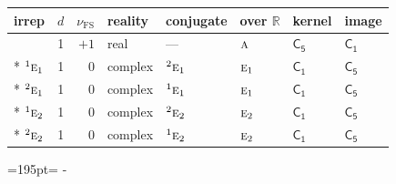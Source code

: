 \documentclass[10pt,a4paper]{article}
\newcommand{\needspace}[1]{\par\penalty-100\begingroup\dimen0=#1\relax\dimen2=\pagegoal
  \advance\dimen2-\pagetotal\ifdim\dimen0>\dimen2\relax\ifdim\dimen2>0pt\vfil\break\fi\fi
  \endgroup}
\numberwithin{equation}{section}
\newcommand{\grp}[1]{\mathsf{#1}}
\newcommand{\irr}[1]{\text{\normalfont\scshape #1}}
\newcommand{\conjpair}[1]{{}^{#1}}
\newcommand{\detbox}[1]{{\setlength{\fboxsep}{1pt}\fbox{#1}}}
\newcommand{\fsind}{\nu_{\mathrm{FS}}}
\begin{document}
{\small\renewcommand{\arraystretch}{1.25}\setlength{\tabcolsep}{4pt}\begin{longtable}{@{}lrrlllll@{}}\toprule
irrep & $d$ & $\fsind$ & reality & conjugate & over $\mathbb{R}$ & kernel & image\\\midrule\endhead
\bottomrule\endfoot\endlastfoot
\detbox{$\irr{a}$} & 1 & $+1$ & real & --- & $\irr{a}$ & \href{C5.pdf}{$\grp{C_{5}}$} & \href{../../../rotation/data/pdf/C1.pdf}{$\grp{C_{1}}$}\\*
$\conjpair{1}\irr{e}_{1}$ & 1 & $0$ & complex & $\conjpair{2}\irr{e}_{1}$ & $\irr{e}_{1}$ & \href{C1.pdf}{$\grp{C_{1}}$} & \href{../../../rotation/data/pdf/C5.pdf}{$\grp{C_{5}}$}\\*
$\conjpair{2}\irr{e}_{1}$ & 1 & $0$ & complex & $\conjpair{1}\irr{e}_{1}$ & $\irr{e}_{1}$ & \href{C1.pdf}{$\grp{C_{1}}$} & \href{../../../rotation/data/pdf/C5.pdf}{$\grp{C_{5}}$}\\*
$\conjpair{1}\irr{e}_{2}$ & 1 & $0$ & complex & $\conjpair{2}\irr{e}_{2}$ & $\irr{e}_{2}$ & \href{C1.pdf}{$\grp{C_{1}}$} & \href{../../../rotation/data/pdf/C5.pdf}{$\grp{C_{5}}$}\\*
$\conjpair{2}\irr{e}_{2}$ & 1 & $0$ & complex & $\conjpair{1}\irr{e}_{2}$ & $\irr{e}_{2}$ & \href{C1.pdf}{$\grp{C_{1}}$} & \href{../../../rotation/data/pdf/C5.pdf}{$\grp{C_{5}}$}\\
\bottomrule\end{longtable}}
\needspace{195pt}
\end{document}
